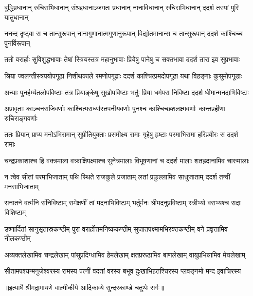 \fourlineindentedshloka
{बुद्धिप्रधानान् रुचिराभिधानान्}
{संश्रद्दधानाञ्जगतः प्रधानान्}
{नानाविधानान् रुचिराभिधानान्}
{ददर्श तस्यां पुरि यातुधानान्} %

\fourlineindentedshloka
{ननन्द दृष्ट्वा स च तान्सुरूपान्}
{नानागुणानात्मगुणानुरूपान्}
{विद्योतमानान्स च तान्सुरूपान्}
{ददर्श कांश्चिच्च पुनर्विरूपान्} %

\fourlineindentedshloka
{ततो वरार्हाः सुविशुद्धभावाः}
{तेषां स्त्रियस्तत्र महानुभावाः}
{प्रियेषु पानेषु च सक्तभावा}
{ददर्श तारा इव सुप्रभावाः} %

\fourlineindentedshloka
{श्रिया ज्वलन्तीस्त्रपयोपगूढा}
{निशीथकाले रमणोपगूढाः}
{ददर्श काश्चित्प्रमदोपगूढा}
{यथा विहङ्गाः कुसुमोपगूडाः} %

\fourlineindentedshloka
{अन्याः पुनर्हर्म्यतलोपविष्टाः}
{तत्र प्रियाङ्केषु सुखोपविष्टाः}
{भर्तुः प्रिया धर्मपरा निविष्टा}
{ददर्श धीमान्मनदाभिविष्टाः} %

\fourlineindentedshloka
{अप्रावृताः काञ्चनराजिवर्णाः}
{काश्चित्परार्ध्यास्तपनीयवर्णाः}
{पुनश्च काश्चिच्छशलक्ष्मवर्णाः}
{कान्तप्रहीणा रुचिराङ्गवर्णाः} %

\fourlineindentedshloka
{ततः प्रियान् प्राप्य मनोऽभिरामान्}
{सुप्रीतियुक्ताः प्रसमीक्ष्य रामाः}
{गृहेषु हृष्टाः परमाभिरामा}
{हरिप्रवीरः स ददर्श रामाः} %

\fourlineindentedshloka
{चन्द्रप्रकाशाश्च हि वक्त्रमाला}
{वक्राक्षिपक्ष्माश्च सुनेत्रमालाः}
{विभूषणानां च ददर्श मालाः}
{शतह्रदानामिव चारुमालाः} %

\fourlineindentedshloka
{न त्वेव सीतां परमाभिजाताम्}
{पथि स्थिते राजकुले प्रजाताम्}
{लतां प्रफुल्लामिव साधुजाताम्}
{ददर्श तन्वीं मनसाभिजाताम्} %

\fourlineindentedshloka
{सनातने वर्त्मनि संनिविष्टाम्}
{रामेक्षणीं तां मदनाभिविष्टाम्}
{भर्तुर्मनः श्रीमदनुप्रविष्टाम्}
{स्त्रीभ्यो वराभ्यश्च सदा विशिष्टाम्} %

\fourlineindentedshloka
{उष्णार्दितां सानुसृतास्रकण्ठीम्}
{पुरा वरार्होत्तमनिष्ककण्ठीम्}
{सुजातपक्ष्मामभिरक्तकण्ठीम्}
{वने प्रवृत्तामिव नीलकण्ठीम्} %

\fourlineindentedshloka
{अव्यक्तलेखामिव चन्द्रलेखाम्}
{पांसुप्रदिग्धामिव हेमलेखाम्}
{क्षतप्ररूढामिव बाणलेखाम्}
{वायुप्रभिन्नामिव मेघलेखाम्} %

\fourlineindentedshloka
{सीतामपश्यन्मनुजेश्वरस्य}
{रामस्य पत्नीं वदतां वरस्य}
{बभूव दुःखाभिहतश्चिरस्य}
{प्लवङ्गमो मन्द इवाचिरस्य} %


{॥इत्यार्षे श्रीमद्रामायणे वाल्मीकीये आदिकाव्ये सुन्दरकाण्डे चतुर्थः सर्गः॥}

